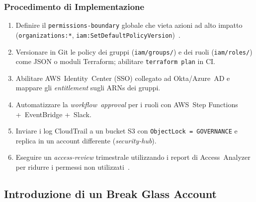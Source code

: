 \subsubsection{Procedimento di Implementazione}
\label{subsubsec:procedura}

\begin{enumerate}
  \item Definire il \texttt{permissions‑boundary} globale che vieta azioni
        ad alto impatto (\texttt{organizations:*}, \texttt{iam:SetDefaultPolicyVersion}) \cite{AWSPermBoundaries}.  
  \item Versionare in Git le policy dei gruppi (\verb|iam/groups/|) e dei
        ruoli (\verb|iam/roles/|) come JSON o
        moduli Terraform; abilitare \verb|terraform plan| in CI.  
  \item Abilitare AWS Identity Center (SSO) collegato ad Okta/Azure AD e
        mappare gli \emph{entitlement} sugli ARNs dei gruppi.  
  \item Automatizzare la \emph{workflow approval} per i ruoli con AWS Step
        Functions + EventBridge + Slack.  
  \item Inviare i log CloudTrail a un bucket S3 con
        \texttt{ObjectLock = GOVERNANCE} e replica in un account
        differente (\textit{security‑hub}).  
  \item Eseguire un \emph{access‑review} trimestrale utilizzando i report
        di Access Analyzer per ridurre i permessi non utilizzati \cite{DatadogLeastPrivilege}.  
\end{enumerate}


\subsection{Introduzione di un Break Glass Account}

